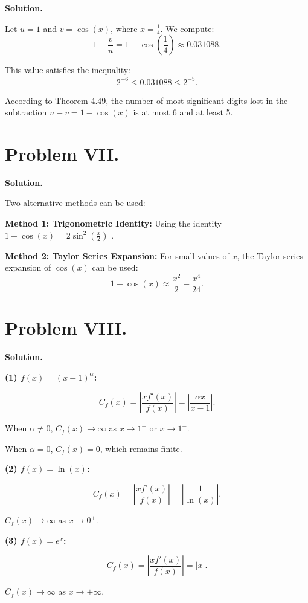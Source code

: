 \documentclass[a4paper]{article}
\begin{document}
\textbf{Solution.}

Let \(u = 1\) and \(v = \cos(x)\), where \(x = \frac{1}{4}\). We compute:
\[
1 - \frac{v}{u} = 1 - \cos\left(\frac{1}{4}\right) \approx 0.031088.
\]

This value satisfies the inequality:
\[
2^{-6} \leq 0.031088 \leq 2^{-5}.
\]

According to Theorem 4.49, the number of most significant digits lost in the subtraction \(u - v = 1 - \cos(x)\) is at most 6 and at least 5.



\section*{Problem VII.}

\textbf{Solution.}

Two alternative methods can be used:

\textbf{Method 1: Trigonometric Identity:}  
Using the identity \(1 - \cos(x) = 2\sin^2\left(\frac{x}{2}\right)\) .

\textbf{Method 2: Taylor Series Expansion:}  
For small values of \(x\), the Taylor series expansion of \(\cos(x)\) can be used:
\[
1 - \cos(x) \approx \frac{x^2}{2} - \frac{x^4}{24}.
\]

\section*{Problem VIII.}

\textbf{Solution.}

\textbf{(1) \(f(x) = (x - 1)^{\alpha}\):}

\[
C_f(x) = \left|\frac{xf'(x)}{f(x)}\right| = \left|\frac{\alpha x}{x - 1}\right|.
\]

When \(\alpha \neq 0\), \(C_f(x) \to \infty\) as \(x \to 1^+\) or \(x \to 1^-\).  

When \(\alpha = 0\), \(C_f(x) = 0\), which remains finite.

\textbf{(2) \(f(x) = \ln(x)\):}

\[
C_f(x) = \left|\frac{xf'(x)}{f(x)}\right| = \left|\frac{1}{\ln(x)}\right|.
\]

\(C_f(x) \to \infty\) as \(x \to 0^+\).  

\textbf{(3) \(f(x) = e^x\):}

\[
C_f(x) = \left|\frac{xf'(x)}{f(x)}\right| = |x|.
\]

\(C_f(x) \to \infty\) as \(x \to \pm \infty\).
\end{document}
